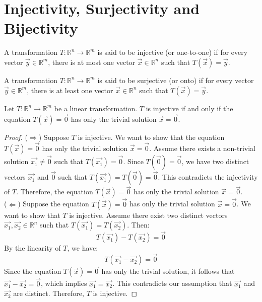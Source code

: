 \section{Injectivity, Surjectivity and Bijectivity}
\begin{definition}
    A transformation $T: \mathbb{R}^n \to \mathbb{R}^m$ is said to be injective (or one-to-one) if for every vector $\vec{y} \in \mathbb{R}^m$, there is at most one vector $\vec{x} \in \mathbb{R}^n$ such that $T(\vec{x}) = \vec{y}$.
\end{definition}

\begin{definition}
    A transformation $T: \mathbb{R}^n \to \mathbb{R}^m$ is said to be surjective (or onto) if for every vector $\vec{y} \in \mathbb{R}^m$, there is at least one vector $\vec{x} \in \mathbb{R}^n$ such that $T(\vec{x}) = \vec{y}$.
\end{definition}

\begin{theorem}
    Let $T: \mathbb{R}^n \to \mathbb{R}^m$ be a linear transformation. $T$ is injective if and only if the equation $T(\vec{x}) = \vec{0}$ has only the trivial solution $\vec{x} = \vec{0}$.
\end{theorem}
\begin{proof}
    ($\Rightarrow$) Suppose $T$ is injective. We want to show that the equation $T(\vec{x}) = \vec{0}$ has only the trivial solution $\vec{x} = \vec{0}$. Assume there exists a non-trivial solution $\vec{x_1} \neq \vec{0}$ such that $T(\vec{x_1}) = \vec{0}$. Since $T(\vec{0}) = \vec{0}$, we have two distinct vectors $\vec{x_1}$ and $\vec{0}$ such that $T(\vec{x_1}) = T(\vec{0}) = \vec{0}$. This contradicts the injectivity of $T$. Therefore, the equation $T(\vec{x}) = \vec{0}$ has only the trivial solution $\vec{x} = \vec{0}$. \\
    ($\Leftarrow$) Suppose the equation $T(\vec{x}) = \vec{0}$ has only the trivial solution $\vec{x} = \vec{0}$. We want to show that $T$ is injective. Assume there exist two distinct vectors $\vec{x_1}, \vec{x_2} \in \mathbb{R}^n$ such that $T(\vec{x_1}) = T(\vec{x_2})$. Then:
    \[
        T(\vec{x_1}) - T(\vec{x_2}) = \vec{0}
    \]
    By the linearity of $T$, we have:
    \[
        T(\vec{x_1} - \vec{x_2}) = \vec{0}
    \]
    Since the equation $T(\vec{x}) = \vec{0}$ has only the trivial solution, it follows that $\vec{x_1} - \vec{x_2} = \vec{0}$, which implies $\vec{x_1} = \vec{x_2}$. This contradicts our assumption that $\vec{x_1}$ and $\vec{x_2}$ are distinct. Therefore, $T$ is injective.
\end{proof}

